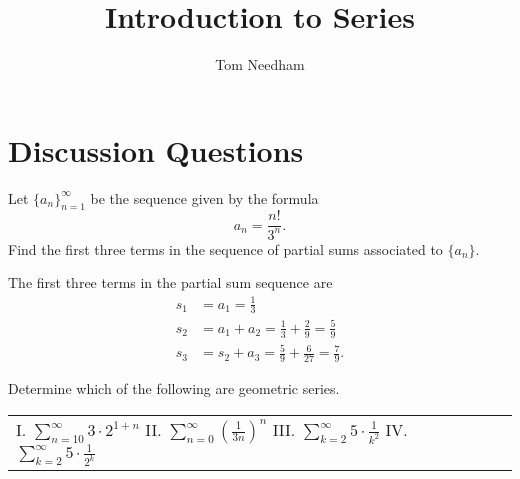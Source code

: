 \documentclass[]{ximera}
\author{Tom Needham}
\title[]{Introduction to Series}
\begin{document}
\begin{abstract}
\end{abstract}
\maketitle

\vspace{-0.9in}

\section{Discussion Questions}

\begin{problem}
Let $\{a_n\}_{n=1}^\infty$ be the sequence given by the formula
$$
a_n = \frac{n!}{3^n}.
$$
Find the first three terms in the sequence of partial sums associated to $\{a_n\}$. 
\end{problem}

\begin{freeResponse}
The first three terms in the partial sum sequence are 
\begin{align*}
s_1 &= a_1 = \frac{1}{3} \\
s_2 &= a_1 + a_2 = \frac{1}{3} + \frac{2}{9} = \frac{5}{9} \\
s_3 &= s_2 + a_3 = \frac{5}{9} + \frac{6}{27} = \frac{7}{9}.
\end{align*}
\end{freeResponse}

\begin{problem}
Determine which of the following are geometric series.
\begin{center}
\begin{tabular}{lll}
I. $\sum_{n=10}^\infty 3 \cdot 2^{1+n}$ \hspace{.2in} II. $\sum_{n=0}^\infty \left(\frac{1}{3n}\right)^n$ \hspace{.2in} III. $\sum_{k=2}^\infty 5 \cdot \frac{1}{k^2}$ \hspace{.2in} IV. $\sum_{k=2}^\infty 5 \cdot \frac{1}{2^k}$
\end{tabular}
\end{center}
\end{problem}
\end{document}

